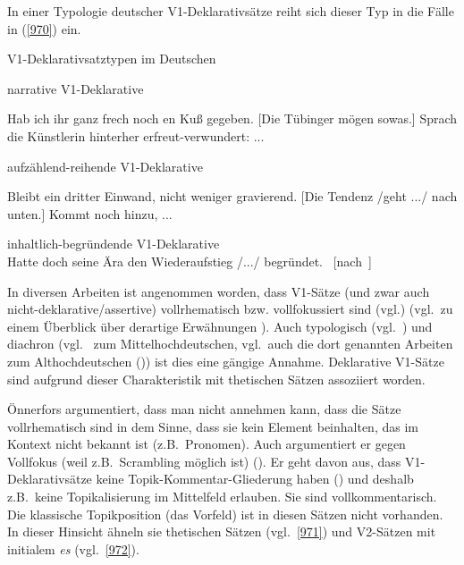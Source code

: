 {In einer Typologie deutscher V1-Deklarativsätze reiht sich dieser Typ in die Fälle in (\ref{970}) ein. 

\begin{exe}
	\ex\label{970} V1-Deklarativsatztypen im Deutschen\\[-1em]
		\begin{xlist}	
			\ex\label{970a} narrative V1-Deklarative 
				\begin{xlist}
					\ex\label{970x} Hab ich ihr ganz frech noch en Kuß gegeben.
					\ex\label{970y} [Die Tübinger mögen sowas.] Sprach die Künstlerin hinterher er\-freut-ver\-wun\-dert: ...					
				\end{xlist}
			\ex\label{970b} aufzählend-reihende V1-Deklarative \is{auf\-zähl\-end-reihender V1-De\-kla\-ra\-tiv\-satz}
				\begin{xlist}
					\ex\label{970s} Bleibt ein dritter Einwand, nicht weniger gravierend.
					\ex\label{970t} [Die Tendenz /geht .../ nach unten.] Kommt noch hinzu, ...				
				\end{xlist}
			\ex\label{970c} inhaltlich-begründende V1-Deklarative \\ Hatte doch seine Ära den Wiederaufstieg /.../ begründet.   	
				\hfill\hbox{\citet[216]{Reis2000} [nach \citet[99--184]{Oennerfors1997}]}
		\end{xlist}
\end{exe}
In diversen Arbeiten ist angenommen worden, dass V1-Sätze (und zwar auch nicht-deklarative/assertive) vollrhematisch  bzw. vollfokussiert  sind (vgl.\linebreak\citealt{Rosengren1992}) (vgl.\ zu einem Überblick über derartige Erwähnungen \citealt[71--86]{Oennerfors1997}). Auch typologisch (vgl.\ \citealt{Sasse1995}) und diachron (vgl.\ \citealt{Coniglio2012} zum Mittelhochdeutschen, vgl.\ auch die dort genannten Arbeiten zum Althochdeut\-schen (\citealt[10]{Coniglio2012})) ist dies eine gängige Annahme. Deklarative V1-Sätze sind aufgrund dieser Charakteristik mit thetischen Sätzen assoziiert worden.

Önnerfors argumentiert, dass man nicht annehmen kann, dass die Sätze vollrhematisch sind in dem Sinne, dass sie kein Element beinhalten, das im Kontext nicht bekannt ist (z.B.\ Pronomen). Auch argumentiert er gegen Vollfokus (weil z.B.\ Scrambling  möglich ist) (\citeyear[76--82]{Oennerfors1997}). Er geht davon aus, dass V1-Deklarativ\-sätze keine Topik-Kommentar-Gliederung  haben (\citeyear[84]{Oennerfors1997}) und des\-halb z.B.\ keine Topikalisierung  im Mittelfeld erlauben. Sie sind vollkommentarisch. Die klassische  Topikposition (das Vorfeld) ist in diesen Sätzen nicht vorhanden. In dieser Hinsicht ähneln sie thetischen Sätzen (vgl.\ \ref{971}) und V2-Sätzen mit initialem \textit{es} (vgl.\ \ref{972}).

}
